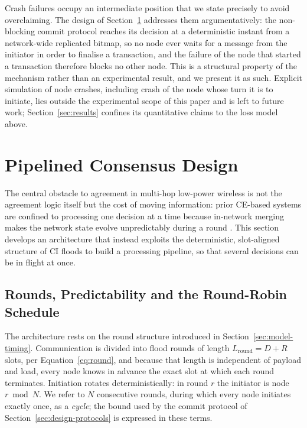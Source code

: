 \documentclass[journal]{IEEEtran}
\newcommand{\CI}{CI}                      %
\newcommand{\CE}{CE}                      %
\newcommand{\Nnodes}{N}                   %
\newcommand{\Diam}{D}                     %
\newcommand{\Nretx}{R}                    %
\newcommand{\Lround}{L_{\mathrm{round}}}  %
\begin{document}
Crash failures occupy an intermediate position that we state precisely to
avoid overclaiming. The design of Section~\ref{sec:design} addresses them
argumentatively: the non-blocking commit protocol reaches its decision at
a deterministic instant from a network-wide replicated bitmap, so no node
ever waits for a message from the initiator in order to finalise a
transaction, and the failure of the node that started a transaction
therefore blocks no other node. This is a structural property of the
mechanism rather than an experimental result, and we present it as such.
Explicit simulation of node crashes, including crash of the node whose
turn it is to initiate, lies outside the experimental scope of this paper
and is left to future work; Section~\ref{sec:results} confines its
quantitative claims to the loss model above.

\section{Pipelined Consensus Design}
\label{sec:design}
The central obstacle to agreement in multi-hop low-power wireless is not
the agreement logic itself but the cost of moving information: prior
\CE-based systems are confined to processing one decision at a time
because in-network merging makes the network state evolve
unpredictably during a round \cite{landsiedel13chaos}. This section
develops an architecture that instead exploits the deterministic,
slot-aligned structure of \CI{} floods to build a processing pipeline, so
that several decisions can be in flight at once.

\subsection{Rounds, Predictability and the Round-Robin Schedule}
\label{sec:design-rounds}

The architecture rests on the round structure introduced in
Section~\ref{sec:model-timing}. Communication is divided into flood
rounds of length $\Lround = \Diam + \Nretx$ slots, per
Equation~\eqref{eq:round}, and because that length is independent of
payload and load, every node knows in advance the exact slot at which each
round terminates. Initiation rotates deterministically: in round $r$ the
initiator is node $r \bmod \Nnodes$. We refer to $\Nnodes$ consecutive
rounds, during which every node initiates exactly once, as a
\emph{cycle}; the bound used by the commit protocol of
Section~\ref{sec:design-protocols} is expressed in these terms.
\end{document}
